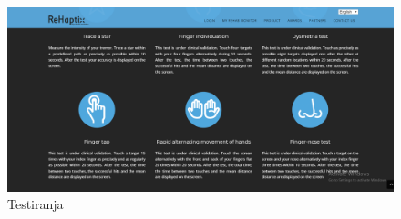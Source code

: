 	\begin{figure}[h]
	\centering
	\includegraphics[scale=0.3]{rehaptix4.png}
	\caption{Testiranja}
	\end{figure}

		
		
	\eject
		
	